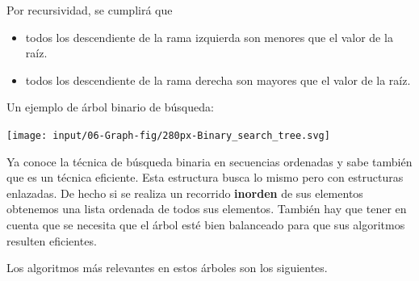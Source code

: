 Por recursividad, se cumplirá que
\begin{itemize}
\item todos los descendiente de la rama izquierda son menores que el valor de la raíz.
\item todos los descendiente de la rama derecha son mayores que el valor de la raíz.
\end{itemize}

\begin{ejemplo}
Un ejemplo de árbol binario de búsqueda:

\centerline{\texttt{[image: input/06-Graph-fig/280px-Binary\_search\_tree.svg]}}
\end{ejemplo}


Ya conoce la técnica de búsqueda binaria en secuencias ordenadas y sabe también que es un técnica eficiente. Esta estructura busca lo mismo pero con estructuras enlazadas. De hecho si se realiza un recorrido \textbf{inorden} de sus elementos obtenemos una lista ordenada de todos sus elementos. También hay que tener en cuenta que se necesita que el árbol esté bien balanceado para que sus algoritmos resulten eficientes.

Los algoritmos más relevantes en estos árboles son los siguientes.

